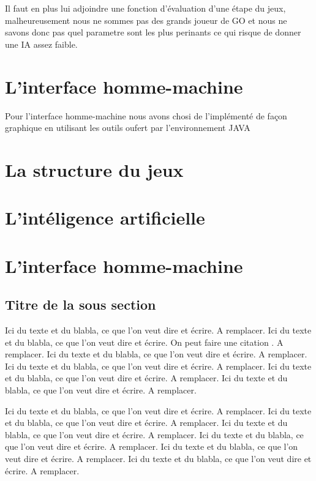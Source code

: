 		Il faut en plus lui adjoindre une fonction d'évaluation d'une étape du jeux, malheureusement nous ne sommes pas des grands joueur de GO et nous ne savons donc pas quel parametre
		sont les plus perinants ce qui risque de donner une IA assez faible.
	
\section{L'interface homme-machine}

		Pour l'interface homme-machine nous avons chosi de l'implémenté de façon graphique en utilisant les outils oufert par l'environnement JAVA
		
\clearpage


\section{La structure du jeux}

\section{L'intéligence artificielle}

\section{L'interface homme-machine}

	


\subsection{Titre de la sous section}

Ici du texte et du blabla, ce que l'on veut dire et écrire. A remplacer. Ici du texte et du blabla, ce que l'on veut dire et écrire. On peut faire une citation \cite{Motclef1}.
A remplacer. Ici du texte et du blabla, ce que l'on veut dire et écrire. A remplacer. Ici du texte et du blabla, ce que l'on veut dire et écrire. A remplacer. Ici du texte et du blabla, ce que l'on veut dire et écrire. A remplacer. Ici du texte et du blabla, ce que l'on veut dire et écrire. A remplacer.

Ici du texte et du blabla, ce que l'on veut dire et écrire. A remplacer. Ici du texte et du blabla, ce que l'on veut dire et écrire. A remplacer.
Ici du texte et du blabla, ce que l'on veut dire et écrire. A remplacer. Ici du texte et du blabla, ce que l'on veut dire et écrire. A remplacer. Ici du texte et du blabla, ce que l'on veut dire et écrire. A remplacer. Ici du texte et du blabla, ce que l'on veut dire et écrire. A remplacer.

